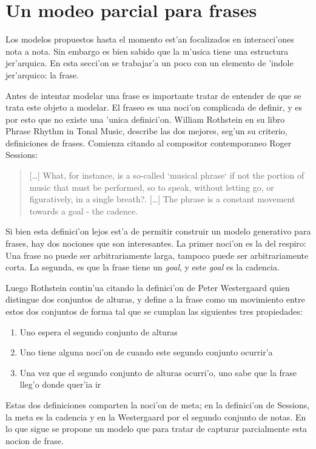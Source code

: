 \section{Un modeo parcial para frases}
\label{sec:phrases}
Los modelos propuestos hasta el momento est'an focalizados en interacci'ones nota a nota. Sin embargo es bien sabido que la m'usica
tiene una estructura jer'arquica. En esta secci'on se trabajar'a un poco con un elemento de 'indole jer'arquico: la frase. 

Antes de intentar modelar una frase es importante tratar de entender de que se trata este objeto a modelar. El fraseo es una
noci'on complicada de definir, y es por esto que no existe una 'unica definici'on. William Rothstein en su libro Phrase Rhythm 
in Tonal Music, describe las dos mejores, seg'un su criterio, definiciones de frases. Comienza citando al compositor contemporaneo
Roger Sessions: 

\begin{quote} 
[\ldots] What, for instance, is a so-called `musical phrase` if not the portion of music that must be performed, so to speak, 
without letting go, or figuratively, in a single breath?. [\ldots] The phrase is a constant movement towards a goal - the cadence.
\end{quote}

Si bien esta definici'on lejos est'a de permitir construir un modelo generativo para frases, hay dos nociones que son interesantes. 
La primer noci'on es la del respiro: Una frase no puede ser arbitrariamente larga, tampoco puede ser arbitrariamente corta. La 
segunda, es que la frase tiene un \emph{goal}, y este \emph{goal} es la cadencia.%

Luego Rothstein contin'ua citando la definici'on de Peter Westergaard quien distingue dos conjuntos de alturas, y define
a la frase como un movimiento entre estos dos conjuntos de forma tal que se cumplan las siguientes tres propiedades:
\begin{enumerate}
 \item Uno espera el segundo conjunto de alturas
 \item Uno tiene alguna noci'on de cuando este segundo conjunto ocurrir'a
 \item Una vez que el segundo conjunto de alturas ocurri'o, uno sabe que la frase lleg'o donde quer'ia ir
\end{enumerate}


Estas dos definiciones comparten la noci'on de meta; en la definici'on de Sessions, la meta es la cadencia y en la Westergaard 
por el segundo conjunto de notas.  En lo que sigue se propone un modelo que para tratar de capturar parcialmente esta nocion de frase.

